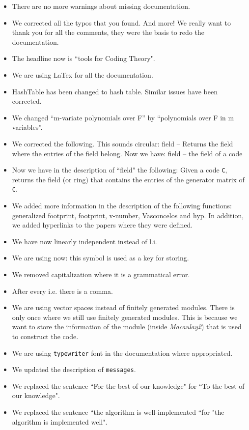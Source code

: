 \documentclass[12pt]{amsart}
\theoremstyle{plain}
\begin{document}
\begin{itemize}
\item There are no more warnings about missing documentation.
\item We corrected all the typos that you found. And more! We really want to thank you for all the comments, they were the basis to redo the documentation.
\item The headline now is ``tools for Coding Theory".
\item We are using LaTex for all the documentation.
\item HashTable has been changed to hash table. Similar issues have been corrected.
\item We changed ``m-variate polynomials over F'' by ``polynomials over F in m variables''.
\item We corrected the following. This sounds circular:	field -- Returns the field where the entries of the field belong.
Now we have: field -- the field of a code
\item Now we have in the description of ``field" the following: Given a code {\tt C}, returns the field (or ring) that contains the entries of the generator matrix of {\tt C}.
\item We added more information in the description of the following functions: generalized footprint, footprint, v-number, Vasconcelos and hyp. In addition, we added hyperlinks to the papers where they were defined.
\item We have now linearly independent instead of l.i.
\item We are using now: this symbol is used as a key for storing.
\item We removed capitalization where it is a grammatical error.
\item After every i.e. there is a comma.
\item We are using vector spaces instead of finitely generated modules. There is only once where we still use finitely generated modules. This is because we want to store the information of the module (inside {\it Macaulay2}) that is used to construct the code.
\item We are using {\tt typewriter} font in the documentation where appropriated.
\item We updated the description of {\tt messages}.
\item We replaced the sentence ``For the best of our knowledge" for ``To the best of our knowledge".
\item We replaced the sentence ``the algorithm is well-implemented ``for "the algorithm is implemented well".

\end{itemize}
\end{document}
